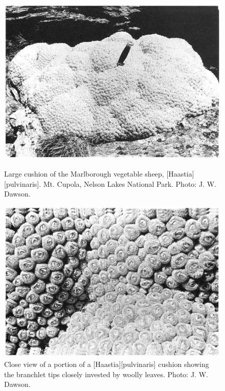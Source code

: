 \begin{figure}[htb]
	\centering
	\begin{minipage}[t]{0.483\textwidth}
		\centering
		\includegraphics[width=\textwidth]{graphics/figure108vegetable-sheep.jpg}
    	\caption[Large cushion of the Marlborough vegetable sheep]{Large cushion of the Marlborough vegetable sheep, [Haastia][pulvinaris].
    	Mt. Cupola, Nelson Lakes National Park.
    	Photo: J. W. Dawson.}%
    	\label{fig:108vegetable-sheep}
	\end{minipage}\hfill%
	\begin{minipage}[t]{0.497\textwidth}
    	\centering
    	\includegraphics[width=\textwidth]{graphics/figure109haastia.jpg}
    	\caption[Close view of a portion of a \emph{Haastia pulvinaris}]{Close view of a portion of a [Haastia][pulvinaris] cushion showing the branchlet tips closely invested by woolly leaves.
    	Photo: J. W. Dawson.}%
    	\label{fig:109haastia}
	\end{minipage}
\end{figure}

